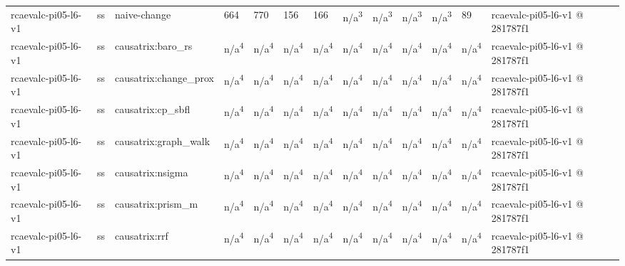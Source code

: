 \begin{table}[t]
\begin{tabular}{lllllllllllll}
rcaevalc-pi05-l6-v1 & ss & naive-change & 664 & 770 & 156 & 166 & n/a\textsuperscript{3} & n/a\textsuperscript{3} & n/a\textsuperscript{3} & n/a\textsuperscript{3} & 89 & rcaevalc-pi05-l6-v1 @ 281787f1 \\
rcaevalc-pi05-l6-v1 & ss & causatrix:baro\_rs & n/a\textsuperscript{4} & n/a\textsuperscript{4} & n/a\textsuperscript{4} & n/a\textsuperscript{4} & n/a\textsuperscript{4} & n/a\textsuperscript{4} & n/a\textsuperscript{4} & n/a\textsuperscript{4} & n/a\textsuperscript{4} & rcaevalc-pi05-l6-v1 @ 281787f1 \\
rcaevalc-pi05-l6-v1 & ss & causatrix:change\_prox & n/a\textsuperscript{4} & n/a\textsuperscript{4} & n/a\textsuperscript{4} & n/a\textsuperscript{4} & n/a\textsuperscript{4} & n/a\textsuperscript{4} & n/a\textsuperscript{4} & n/a\textsuperscript{4} & n/a\textsuperscript{4} & rcaevalc-pi05-l6-v1 @ 281787f1 \\
rcaevalc-pi05-l6-v1 & ss & causatrix:cp\_sbfl & n/a\textsuperscript{4} & n/a\textsuperscript{4} & n/a\textsuperscript{4} & n/a\textsuperscript{4} & n/a\textsuperscript{4} & n/a\textsuperscript{4} & n/a\textsuperscript{4} & n/a\textsuperscript{4} & n/a\textsuperscript{4} & rcaevalc-pi05-l6-v1 @ 281787f1 \\
rcaevalc-pi05-l6-v1 & ss & causatrix:graph\_walk & n/a\textsuperscript{4} & n/a\textsuperscript{4} & n/a\textsuperscript{4} & n/a\textsuperscript{4} & n/a\textsuperscript{4} & n/a\textsuperscript{4} & n/a\textsuperscript{4} & n/a\textsuperscript{4} & n/a\textsuperscript{4} & rcaevalc-pi05-l6-v1 @ 281787f1 \\
rcaevalc-pi05-l6-v1 & ss & causatrix:nsigma & n/a\textsuperscript{4} & n/a\textsuperscript{4} & n/a\textsuperscript{4} & n/a\textsuperscript{4} & n/a\textsuperscript{4} & n/a\textsuperscript{4} & n/a\textsuperscript{4} & n/a\textsuperscript{4} & n/a\textsuperscript{4} & rcaevalc-pi05-l6-v1 @ 281787f1 \\
rcaevalc-pi05-l6-v1 & ss & causatrix:prism\_m & n/a\textsuperscript{4} & n/a\textsuperscript{4} & n/a\textsuperscript{4} & n/a\textsuperscript{4} & n/a\textsuperscript{4} & n/a\textsuperscript{4} & n/a\textsuperscript{4} & n/a\textsuperscript{4} & n/a\textsuperscript{4} & rcaevalc-pi05-l6-v1 @ 281787f1 \\
rcaevalc-pi05-l6-v1 & ss & causatrix:rrf & n/a\textsuperscript{4} & n/a\textsuperscript{4} & n/a\textsuperscript{4} & n/a\textsuperscript{4} & n/a\textsuperscript{4} & n/a\textsuperscript{4} & n/a\textsuperscript{4} & n/a\textsuperscript{4} & n/a\textsuperscript{4} & rcaevalc-pi05-l6-v1 @ 281787f1 \\

\end{tabular}
\end{table}

